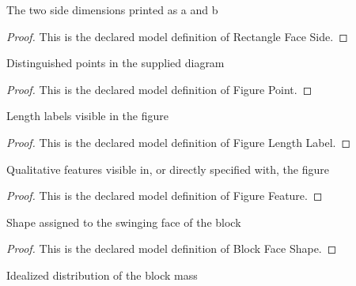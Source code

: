 \begin{definition}
  \label{def:physics:phyx-mini-0265:phyxminiproblems-problemphyxmini0265-rectanglefaceside}
  The two side dimensions printed as a and b
\end{definition}
\begin{proof}
  This is the declared model definition of Rectangle Face Side.
\end{proof}
\begin{definition}
  \label{def:physics:phyx-mini-0265:phyxminiproblems-problemphyxmini0265-figurepoint}
  Distinguished points in the supplied diagram
\end{definition}
\begin{proof}
  This is the declared model definition of Figure Point.
\end{proof}
\begin{definition}
  \label{def:physics:phyx-mini-0265:phyxminiproblems-problemphyxmini0265-figurelengthlabel}
  Length labels visible in the figure
\end{definition}
\begin{proof}
  This is the declared model definition of Figure Length Label.
\end{proof}
\begin{definition}
  \label{def:physics:phyx-mini-0265:phyxminiproblems-problemphyxmini0265-figurefeature}
  Qualitative features visible in, or directly specified with, the figure
\end{definition}
\begin{proof}
  This is the declared model definition of Figure Feature.
\end{proof}
\begin{definition}
  \label{def:physics:phyx-mini-0265:phyxminiproblems-problemphyxmini0265-blockfaceshape}
  Shape assigned to the swinging face of the block
\end{definition}
\begin{proof}
  This is the declared model definition of Block Face Shape.
\end{proof}
\begin{definition}
  \label{def:physics:phyx-mini-0265:phyxminiproblems-problemphyxmini0265-blockmassdistribution}
  Idealized distribution of the block mass
\end{definition}
